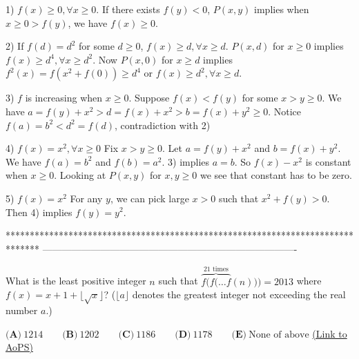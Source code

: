 \begin{solution}
	1) $f(x)\geq0,\forall x\geq0$.
If there exists $f(y)<0$, $P(x,y)$ implies when $x\geq 0>f(y)$, we have $f(x)\geq0$.

2) If $f(d)=d^2$ for some $d\geq0$, $f(x)\geq d,\forall x\geq d$.
$P(x,d)$  for $x\geq0$ implies $f(x)\geq d^4,\forall x\geq d^2$.
Now $P(x,0)$ for $x\geq d$ implies $f^2(x)=f(x^2+f(0))\geq d^4$ or $f(x)\geq d^2,\forall x\geq d$.

3) $f$ is increasing when $x\geq0$.
Suppose $f(x)<f(y)$ for some $x>y\geq0$.
We have $a=f(y)+x^2>d=f(x)+x^2>b=f(x)+y^2\geq0$.
Notice $f(a)=b^2<d^2=f(d)$, contradiction with 2)

4) $f(x)=x^2,\forall x\geq0$
Fix $x>y\geq0$. Let $a=f(y)+x^2$ and $b=f(x)+y^2$.
We have $f(a)=b^2$ and $f(b)=a^2$. 3) implies $a=b$. So $f(x)-x^2$ is constant when $x\geq0$. Looking at $P(x,y)$ for $x,y\geq0$ we see that constant has to be zero.

5) $f(x)=x^2$
For any $y$, we can pick large $x>0$ such that $x^2+f(y)>0$. Then 4) implies $f(y)=y^2$.
\end{solution}
*******************************************************************************
-------------------------------------------------------------------------------

\begin{problem}
	What is the least positive integer $n$ such that $\overbrace{f(f(\dots f}^{21 \text{ times}}(n)))=2013$ where $f(x)=x+1+\lfloor \sqrt x \rfloor$? ($\lfloor a \rfloor$ denotes the greatest integer not exceeding the real number $a$.)

$ 
\textbf{(A)}\ 1214
\qquad\textbf{(B)}\ 1202
\qquad\textbf{(C)}\ 1186
\qquad\textbf{(D)}\ 1178
\qquad\textbf{(E)}\ \text{None of above}
$
	\flushright \href{https://artofproblemsolving.com/community/c6h530386}{(Link to AoPS)}
\end{problem}




